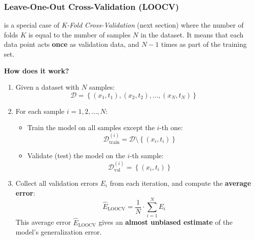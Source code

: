 \subsubsection{Leave-One-Out Cross-Validation (LOOCV)}

 is a special case of \emph{K-Fold Cross-Validation} (next section) where the number of folds $K$ is equal to the number of samples $N$ in the dataset. It means that each data point acts \textbf{once} as validation data, and $N-1$ times as part of the training set.

\highspace
\begin{flushleft}
    \textcolor{Green3}{ \textbf{How does it work?}}
\end{flushleft}
\begin{enumerate}
    \item Given a dataset with $N$ samples:
    \begin{equation*}
        \mathcal{D} = \left\{
            \left(x_1, t_1\right),
            \left(x_2, t_2\right),
            \ldots,
            \left(x_N, t_N\right)
        \right\}
    \end{equation*}
    \item For each sample $i = 1, 2, \ldots, N$:
    \begin{itemize}
        \item Train the model on all samples except the $i$-th one:
        \begin{equation*}
            \mathcal{D}_{\text{train}}^{(i)} = \mathcal{D} \setminus \left\{ \left(x_i, t_i\right) \right\}
        \end{equation*}
        \item Validate (test) the model on the $i$-th sample:
        \begin{equation*}
            \mathcal{D}_{\text{val}}^{(i)} = \left\{ \left(x_i, t_i\right) \right\}
        \end{equation*}
    \end{itemize}
    \item Collect all validation errors $E_{i}$ from each iteration, and compute the \textbf{average error}:
    \begin{equation*}
        \hat{E}_{\text{LOOCV}} = \dfrac{1}{N} \cdot \sum_{i=1}^{N} E_{i}
    \end{equation*}
    This average error $\hat{E}_{\text{LOOCV}}$ gives an \textbf{almost unbiased estimate} of the model's generalization error.
\end{enumerate}

